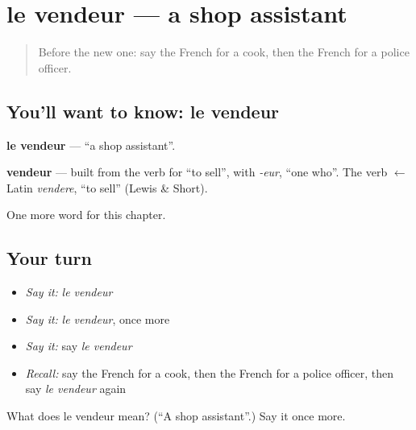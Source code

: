 \section[le vendeur]{le vendeur — a shop assistant}

\label{lesson:FR-C123-vendeur}



\begin{quote}
Before the new one: say the French for a cook, then the French for a police officer.
\end{quote}

\subsection*{You'll want to know: le vendeur}
\textbf{le vendeur} — \textquotedblleft{}a shop assistant\textquotedblright{}.

\begin{cousinweb}
\textbf{vendeur} — built from the verb for \textquotedblleft{}to sell\textquotedblright{}, with \emph{-eur}, \textquotedblleft{}one who\textquotedblright{}. The verb $\leftarrow$ Latin \emph{vendere}, \textquotedblleft{}to sell\textquotedblright{} (Lewis \& Short).
\end{cousinweb}

\begin{grammarlens}[title={What you've built}]
One more word for this chapter.
\end{grammarlens}

\subsection*{Your turn}
\begin{itemize}
\raggedright
  \item \emph{Say it:} \emph{le vendeur}
  \item \emph{Say it:} \emph{le vendeur}, once more
  \item \emph{Say it:} say \emph{le vendeur}
  \item \emph{Recall:} say the French for a cook, then the French for a police officer, then say \emph{le vendeur} again
\end{itemize}

\begin{tcolorbox}[breakable,colback=teal!4,colframe=teal!35!black,title={Before you move on}]
What does le vendeur mean? (\textquotedblleft{}A shop assistant\textquotedblright{}.) Say it once more.
\end{tcolorbox}
